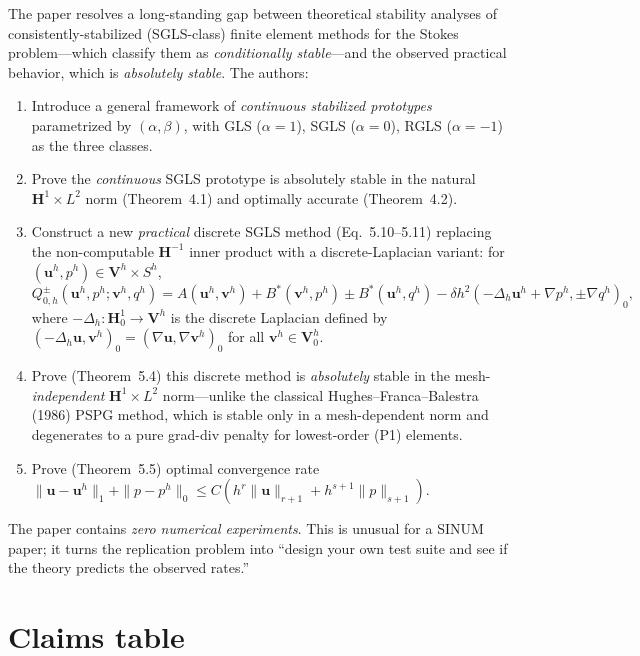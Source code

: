 \documentclass[11pt]{article}
\begin{document}
The paper resolves a long-standing gap between theoretical stability analyses of consistently-stabilized (SGLS-class) finite element methods for the Stokes problem---which classify them as \emph{conditionally stable}---and the observed practical behavior, which is \emph{absolutely stable}. The authors:
\begin{enumerate}
    \item Introduce a general framework of \emph{continuous stabilized prototypes} parametrized by $(\alpha,\beta)$, with GLS ($\alpha=1$), SGLS ($\alpha=0$), RGLS ($\alpha=-1$) as the three classes.
    \item Prove the \emph{continuous} SGLS prototype is absolutely stable in the natural $\mathbf{H}^1 \times L^2$ norm (Theorem~4.1) and optimally accurate (Theorem~4.2).
    \item Construct a new \emph{practical} discrete SGLS method (Eq.\ 5.10--5.11) replacing the non-computable $\mathbf{H}^{-1}$ inner product with a discrete-Laplacian variant: for $(\mathbf{u}^h, p^h) \in \mathbf{V}^h \times S^h$,
    \[
      Q^{\pm}_{0,h}(\mathbf{u}^h, p^h; \mathbf{v}^h, q^h) = A(\mathbf{u}^h,\mathbf{v}^h) + B^*(\mathbf{v}^h,p^h) \pm B^*(\mathbf{u}^h,q^h) - \delta h^2 (-\Delta_h \mathbf{u}^h + \nabla p^h, \pm \nabla q^h)_0,
    \]
    where $-\Delta_h : \mathbf{H}^1_0 \to \mathbf{V}^h$ is the discrete Laplacian defined by $(-\Delta_h \mathbf{u}, \mathbf{v}^h)_0 = (\nabla \mathbf{u}, \nabla \mathbf{v}^h)_0$ for all $\mathbf{v}^h \in \mathbf{V}^h_0$.
    \item Prove (Theorem~5.4) this discrete method is \emph{absolutely} stable in the mesh-\emph{independent} $\mathbf{H}^1 \times L^2$ norm---unlike the classical Hughes--Franca--Balestra (1986) PSPG method, which is stable only in a mesh-dependent norm and degenerates to a pure grad-div penalty for lowest-order (P1) elements.
    \item Prove (Theorem~5.5) optimal convergence rate $\|\mathbf{u}-\mathbf{u}^h\|_1 + \|p-p^h\|_0 \leq C(h^r \|\mathbf{u}\|_{r+1} + h^{s+1}\|p\|_{s+1})$.
\end{enumerate}

The paper contains \emph{zero numerical experiments}. This is unusual for a SINUM paper; it turns the replication problem into ``design your own test suite and see if the theory predicts the observed rates.''

\section{Claims table}
\end{document}
